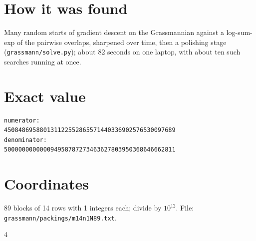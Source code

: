 \documentclass[11pt,a4paper]{article}
\begin{document}
\section{How it was found}
Many random starts of gradient descent on the Grassmannian against a log-sum-exp of the pairwise overlaps, sharpened over time, then a polishing stage (\texttt{grassmann/solve.py}); about 82 seconds on one laptop, with about ten such searches running at once.


\appendix
\section{Exact value}
{\small
\begin{verbatim}
numerator:
450848695880131122552865571440336902576530097689
denominator:
500000000000094958787273463627803950368646662811
\end{verbatim}}

\section{Coordinates}
89 blocks of 14 rows with 1 integers each; divide by $10^{12}$. File: \texttt{grassmann/packings/m14n1N89.txt}.
{\tiny
\begin{multicols}{4}
\end{multicols}}
\end{document}
